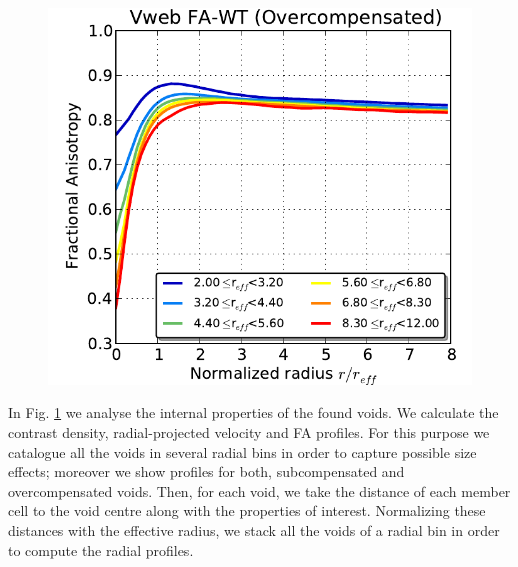 \documentclass[a4,useAMS,usenatbib,usegraphicx]{mn2e}
\begin{document}
\begin{figure}
  \includegraphics[trim = 1mm 0mm 5mm 0mm, clip, keepaspectratio=true,
  width=0.24\textheight]{voids_FA_VwebFAG1.pdf}  
  


  \label{fig:RhoVel}
  \vspace{0.1 cm}

\end{figure}


In Fig. \ref{fig:RhoVel} we analyse the internal properties of the found 
voids. We calculate the contrast density, radial-projected velocity and 
FA profiles. For this purpose we catalogue all the voids in several radial 
bins in order to capture possible size effects; moreover we show profiles 
for both, subcompensated and overcompensated voids. Then, for each void, 
we take the distance of each member cell to the void centre along with the 
properties of interest. Normalizing these distances with the effective 
radius, we stack all the voids of a radial bin in order to compute the 
radial profiles.


\end{document}
